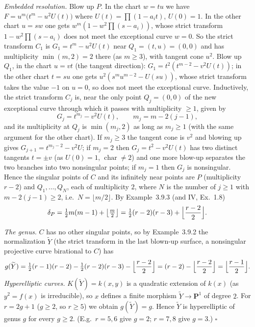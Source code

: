 \documentclass[11pt]{article}
\begin{document}
\emph{Embedded resolution.} Blow up $P$. In the chart $w=tu$ we have $F=u^m\bigl(t^m-u^2U(t)\bigr)$ where $U(t)=\prod(1-a_it)$, $U(0)=1$. In the other chart $u=sw$ one gets $w^m(1-w^2\prod(s-a_i))$, whose strict transform $1-w^2\prod(s-a_i)$ does not meet the exceptional curve $w=0$. So the strict transform $C_1$ is $G_1=t^m-u^2U(t)$ near $Q_1=(t,u)=(0,0)$ and has multiplicity $\min(m,2)=2$ there (as $m\ge3$), with tangent cone $u^2$. Blow up $Q_1$, in the chart $u=vt$ (the tangent direction): $G_1=t^2(t^{m-2}-v^2U(t))$; in the other chart $t=su$ one gets $u^2(s^mu^{m-2}-U(su))$, whose strict transform takes the value $-1$ on $u=0$, so does not meet the exceptional curve. Inductively, the strict transform $C_j$ is, near the only point $Q_j=(0,0)$ of the new exceptional curve through which it passes with multiplicity $\ge 1$, given by
\[
G_j=t^{m_j}-v^2U(t),\qquad m_j=m-2(j-1),
\]
and its multiplicity at $Q_j$ is $\min(m_j,2)$ as long as $m_j\ge1$ (with the same argument for the other chart). If $m_j\ge3$ the tangent cone is $v^2$ and blowing up gives $G_{j+1}=t^{m_j-2}-v^2U$; if $m_j=2$ then $G_j=t^2-v^2U(t)$ has two distinct tangents $t=\pm v$ (as $U(0)=1$, $\operatorname{char}\ne2$) and one more blow-up separates the two branches into two nonsingular points; if $m_j=1$ then $G_j$ is nonsingular. Hence the singular points of $C$ and its infinitely near points are $P$ (multiplicity $r-2$) and $Q_1,\dots,Q_N$, each of multiplicity $2$, where $N$ is the number of $j\ge1$ with $m-2(j-1)\ge2$, i.e.\ $N=\lfloor m/2\rfloor$. By Example~3.9.3 (and IV, Ex.~1.8)
\[
\delta_P=\tfrac12m(m-1)+\bigl\lfloor\tfrac m2\bigr\rfloor=\tfrac12(r-2)(r-3)+\Bigl\lfloor\frac{r-2}{2}\Bigr\rfloor .
\]

\emph{The genus.} $C$ has no other singular points, so by Example~3.9.2 the normalization $\widetilde Y$ (the strict transform in the last blown-up surface, a nonsingular projective curve birational to $C$) has
\[
g(\widetilde Y)=\tfrac12(r-1)(r-2)-\tfrac12(r-2)(r-3)-\Bigl\lfloor\frac{r-2}2\Bigr\rfloor=(r-2)-\Bigl\lfloor\frac{r-2}2\Bigr\rfloor=\Bigl\lfloor\frac{r-1}{2}\Bigr\rfloor .
\]
\emph{Hyperelliptic curves.} $K(\widetilde Y)=k(x,y)$ is a quadratic extension of $k(x)$ (as $y^2=f(x)$ is irreducible), so $x$ defines a finite morphism $\widetilde Y\to\mathbf P^1$ of degree $2$. For $r=2g+1$ ($g\ge2$, so $r\ge5$) we obtain $g(\widetilde Y)=g$. Hence $\widetilde Y$ is hyperelliptic of genus $g$ for every $g\ge2$. (E.g.\ $r=5,6$ give $g=2$; $r=7,8$ give $g=3$.) \hfill$\square$
\end{document}
